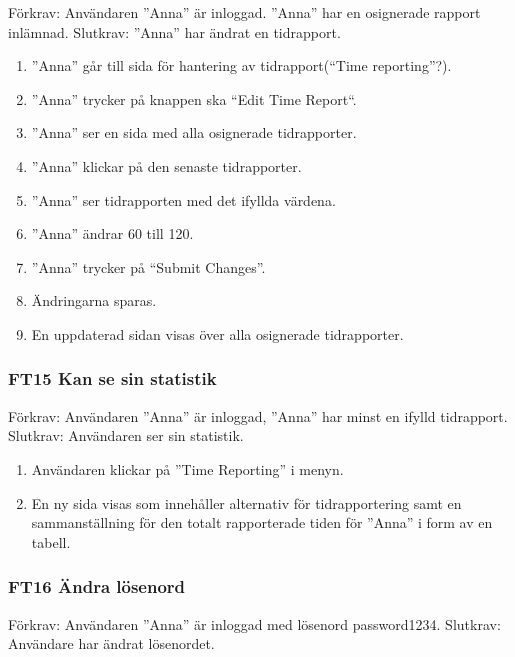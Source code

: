 \documentclass[paper=a4, fontsize=11pt,twoside]{article}
\begin{document}
		Förkrav: Användaren ”Anna” är inloggad. ”Anna” har en osignerade rapport inlämnad. 
		\newline
		Slutkrav: ”Anna” har ändrat en tidrapport.
		
		\begin{enumerate}
		 \item ”Anna” går till sida för hantering av tidrapport(“Time reporting”?).
			\item ”Anna” trycker på knappen ska “Edit Time Report“.
			\item ”Anna” ser en sida med alla osignerade tidrapporter.
			\item ”Anna” klickar på den senaste tidrapporter.
			\item ”Anna” ser tidrapporten med det ifyllda värdena.
			\item ”Anna” ändrar 60 till 120.
			\item ”Anna” trycker på “Submit Changes”.
			\item Ändringarna sparas.
			\item En uppdaterad sidan visas över alla osignerade tidrapporter.
		  
		\end{enumerate}
		
		\subsubsection*{FT15 Kan se sin statistik}
		Förkrav: Användaren ”Anna” är inloggad, ”Anna” har minst en ifylld tidrapport.
		\newline
		Slutkrav: Användaren ser sin statistik.
		
		\begin{enumerate}
		  \item Användaren klickar på ”Time Reporting” i menyn. 
		  \item En ny sida visas som innehåller alternativ för tidrapportering samt en
		  sammanställning för den totalt rapporterade tiden för ”Anna” i form av en
		  tabell.
		  
		\end{enumerate}
		
		\subsubsection*{FT16 Ändra lösenord}
		
		Förkrav: Användaren ”Anna” är inloggad med lösenord password1234.
		\newline 
		Slutkrav: Användare har ändrat lösenordet.
		
\end{document}
